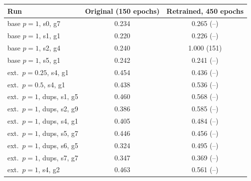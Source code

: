 \begin{tabular}{@{}lcc@{}}
\toprule
Run & Original (150 epochs) & Retrained, 450 epochs\\
\midrule
base $p{=}1$, s0, g7 & 0.234 & 0.265 (--) \\
base $p{=}1$, s1, g1 & 0.220 & 0.226 (--) \\
base $p{=}1$, s2, g4 & 0.240 & 1.000 (151) \\
base $p{=}1$, s5, g1 & 0.242 & 0.241 (--) \\
ext.\ $p{=}0.25$, s4, g1 & 0.454 & 0.436 (--) \\
ext.\ $p{=}0.5$, s4, g1 & 0.438 & 0.536 (--) \\
ext.\ $p{=}1$, dups, s1, g5 & 0.460 & 0.568 (--) \\
ext.\ $p{=}1$, dups, s2, g9 & 0.386 & 0.585 (--) \\
ext.\ $p{=}1$, dups, s4, g1 & 0.405 & 0.484 (--) \\
ext.\ $p{=}1$, dups, s5, g7 & 0.446 & 0.456 (--) \\
ext.\ $p{=}1$, dups, s6, g5 & 0.324 & 0.495 (--) \\
ext.\ $p{=}1$, dups, s7, g7 & 0.347 & 0.369 (--) \\
ext.\ $p{=}1$, s4, g2 & 0.463 & 0.561 (--) \\
\bottomrule
\end{tabular}
